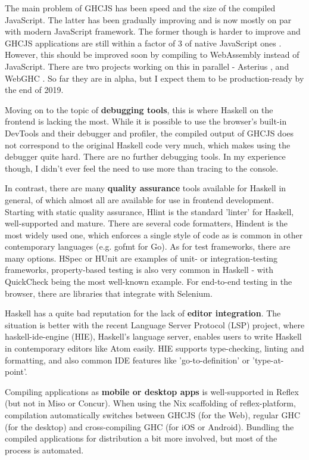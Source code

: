 \documentclass[english,odsaz]{fitthesis}
\begin{document}
The main problem of GHCJS has been speed and the size of the compiled
JavaScript. The latter has been gradually improving and is now mostly on par
with modern JavaScript framework. The former though is harder to improve and
GHCJS applications are still within a factor of 3 of native JavaScript ones
\cite{nanda_bench}. However, this should be improved soon by compiling to
WebAssembly instead of JavaScript. There are two projects working on this in
parallel - Asterius \cite{asterius}, and WebGHC \cite{webghc}. So far they are in
alpha, but I expect them to be production-ready by the end of 2019.

Moving on to the topic of \textbf{debugging tools}, this is where Haskell on the frontend
is lacking the most. While it is possible to use the browser's built-in DevTools
and their debugger and profiler, the compiled output of GHCJS does not
correspond to the original Haskell code very much, which makes using the
debugger quite hard. There are no further debugging tools. In my experience
though, I didn't ever feel the need to use more than tracing to the console.

In contrast, there are many \textbf{quality assurance} tools available for Haskell in
general, of which almost all are available for use in frontend
development. Starting with static quality assurance, Hlint is the standard
'linter' for Haskell, well-supported and mature. There are several code
formatters, Hindent is the most widely used one, which enforces a single style
of code as is common in other contemporary languages (e.g. gofmt for Go).  As
for test frameworks, there are many options. HSpec or HUnit are examples of
unit- or integration-testing frameworks, property-based testing is also very
common in Haskell - with QuickCheck \cite{claessen2011quickcheck} being the most
well-known example. For end-to-end testing in the browser, there are libraries
that integrate with Selenium.

Haskell has a quite bad reputation for the lack of \textbf{editor integration}. The
situation is better with the recent Language Server Protocol (LSP) project,
where haskell-ide-engine (HIE), Haskell's language server, enables users to
write Haskell in contemporary editors like Atom easily. HIE supports
type-checking, linting and formatting, and also common IDE features like
'go-to-definition' or 'type-at-point'.

Compiling applications as \textbf{mobile or desktop apps} is well-supported in Reflex
(but not in Miso or Concur). When using the Nix scaffolding of reflex-platform,
compilation automatically switches between GHCJS (for the Web), regular GHC (for
the desktop) and cross-compiling GHC (for iOS or Android). Bundling the compiled
applications for distribution a bit more involved, but most of the process is
automated.
\end{document}
